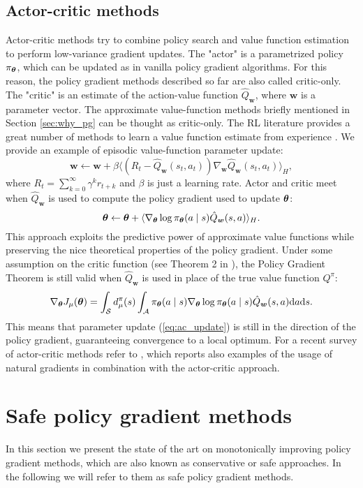 \subsection{Actor-critic methods}
Actor-critic methods try to combine policy search and value function estimation to perform low-variance gradient updates. The "actor" is a parametrized policy $\pi_{\boldsymbol{\theta}}$, which can be updated as in vanilla policy gradient algorithms. For this reason, the policy gradient methods described so far are also called critic-only. The "critic" is an estimate of the action-value function $\hat{Q}_{\boldsymbol{w}}$, where $\boldsymbol{w}$ is a parameter vector. The approximate value-function methods briefly mentioned in Section \ref{sec:why_pg} can be thought as critic-only. The \ac{RL} literature provides a great number of methods to learn a value function estimate from experience \cite{Sutton:1998:IRL:551283}. We provide an example of episodic value-function parameter update:
\[
	\boldsymbol{w} \gets \boldsymbol{w} + \beta\langle
		(R_t-\hat{Q}_{\boldsymbol{w}}(s_t,a_t))
		\nabla_{\boldsymbol{w}}\hat{Q}_{\boldsymbol{w}}(s_t,a_t)\rangle_H,
\] 
where $R_t = \sum\limits_{k=0}^{\infty}\gamma^kr_{t+k}$ and $\beta$ is just a learning rate.
Actor and critic meet when $\hat{Q}_{\boldsymbol{w}}$ is used to compute the policy gradient used to update $\boldsymbol{\theta}$:
\begin{equation}\label{eq:ac_update} 
	\boldsymbol{\theta} \gets \boldsymbol{\theta} + \langle\nabla_{\boldsymbol{\theta}}\log\pi_{\boldsymbol{\theta}}(a \mid s) \hat{Q}_{\boldsymbol{w}}(s,a)\rangle_H.
\end{equation}
This approach exploits the predictive power of approximate value functions while preserving the nice theoretical properties of the policy gradient. Under some assumption on the critic function (see Theorem 2 in \cite{Sutton1999a}), the Policy Gradient Theorem is still valid when $\hat{Q}_{\boldsymbol{w}}$ is used in place of the true value function $Q^\pi$:
\[
	\nabla_{\boldsymbol{\theta}}J_\mu(\boldsymbol{\theta}) = \int_{\mathcal{S}}d_{\mu}^{\pi}(s)
		\int_{\mathcal{A}}\pi_{\boldsymbol{\theta}}(a \mid s)\nabla_{\boldsymbol{\theta}}\log\pi_{\boldsymbol{\theta}}(a \mid s)
		\hat{Q}_{\boldsymbol{w}}(s,a)\mathrm{d}a\mathrm{d}s.
\]
This means that parameter update (\ref{eq:ac_update}) is still in the direction of the policy gradient, guaranteeing convergence to a local optimum.
For a recent survey of actor-critic methods refer to \cite{grondman2012survey}, which reports also examples of the usage of natural gradients in combination with the actor-critic approach.

\section{Safe policy gradient methods}
In this section we present the state of the art on monotonically improving policy gradient methods, which are also known as conservative or safe approaches. In the following we will refer to them as safe policy gradient methods.

